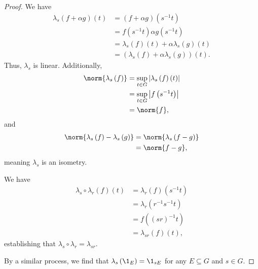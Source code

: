 \begin{proof}
  We have
  \begin{align*}
    \lambda_s\left(f + \alpha g\right)\left(t\right) &= \left(f + \alpha g\right) \left(s^{-1}t\right)\\
                                                     &= f\left(s^{-1}t\right) \alpha g\left(s^{-1}t\right)\\
                                                     &= \lambda_s\left(f\right)\left(t\right) + \alpha \lambda_s\left(g\right)\left(t\right)\\
                                                     &= \left(\lambda_s\left(f\right) + \alpha \lambda_s\left(g\right)\right)(t).
  \end{align*}
  Thus, $\lambda_s$ is linear. Additionally,
  \begin{align*}
    \norm{\lambda_s\left(f\right)} &= \sup_{t\in G}\left\vert \lambda_s\left(f\right)\left(t\right) \right\vert\\
                                   &= \sup_{t\in G}\left\vert f\left(s^{-1}t\right) \right\vert\\
                                   &= \norm{f},
  \end{align*}
  and
  \begin{align*}
    \norm{\lambda_s\left(f\right) - \lambda_s\left(g\right)} &= \norm{\lambda_s\left(f-g\right)}\\
                                                             &= \norm{f-g},
  \end{align*}
  meaning $\lambda_s$ is an isometry.\newline

  We have
  \begin{align*}
    \lambda_s\circ \lambda_r\left(f\right)\left(t\right) &= \lambda_r\left(f\right)\left(s^{-1}t\right)\\
                                                         &= \lambda_r\left(r^{-1}s^{-1}t\right)\\
                                                         &= f\left(\left(sr\right)^{-1}t\right)\\
                                                         &= \lambda_{sr}\left(f\right)\left(t\right),
  \end{align*}
  establishing that $\lambda_s\circ \lambda_r = \lambda_{sr}$.\newline

  By a similar process, we find that $\lambda_{s}\left(\1_{E}\right) = \1_{sE}$ for any $E\subseteq G$ and $s\in G$.
\end{proof}
